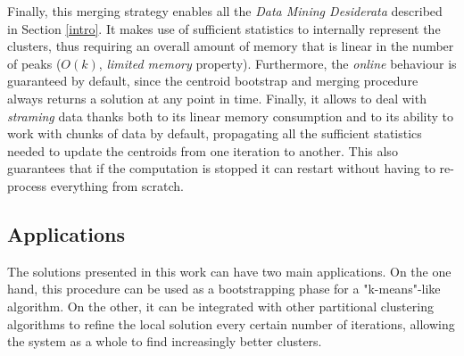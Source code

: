 Finally, this merging strategy enables all the \emph{Data Mining Desiderata} described in Section 
\ref{intro}. It makes use of sufficient statistics to internally represent the clusters, thus 
requiring an overall amount of memory that is linear in the number of peaks ($O(k)$, \emph{limited memory}
property). Furthermore, the \emph{online} behaviour is guaranteed by default, since the centroid
bootstrap and merging procedure always returns a solution at any point in time. Finally, it allows
to deal with \emph{straming} data thanks both to its linear memory consumption and to its ability to
work with chunks of data by default, propagating all the sufficient statistics needed to update the 
centroids from one iteration to another. This also guarantees that if the computation is stopped
it can restart without having to re-process everything from scratch.


\subsection*{Applications}
The solutions presented in this work can have two main applications. On the one hand,
this procedure can be used as a bootstrapping phase for a  "k-means"-like algorithm. 
On the other, it can be integrated with other partitional clustering algorithms to
refine the local solution every certain number of iterations, allowing the system as a
whole to find increasingly better clusters.